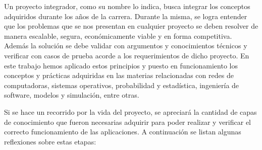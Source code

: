 Un proyecto integrador, como su nombre lo indica, busca integrar los conceptos adquiridos durante los años de la carrera. Durante la misma, se logra entender que los problemas que se nos presentan en cualquier proyecto se deben resolver de manera escalable, segura, económicamente viable y en forma competitiva. Además la solución se debe validar con argumentos y conocimientos técnicos y verificar con casos de prueba acorde a los requerimientos de dicho proyecto. En este trabajo hemos aplicado estos principios y puesto en funcionamiento los conceptos y prácticas adquiridas en las materias relacionadas con redes de computadoras, sistemas operativos, probabilidad y estadística, ingeniería de software, modelos y simulación, entre otras.

Si se hace un recorrido por la vida del proyecto, se apreciará la cantidad de capas de conocimiento que fueron necesarias adquirir para poder realizar y verificar el correcto funcionamiento de las aplicaciones. A continuación se listan algunas reflexiones sobre estas etapas:

